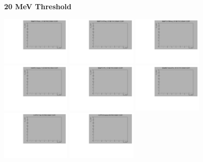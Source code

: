 \textbf{20 MeV Threshold}

\begin{center}

  \includegraphics[width=0.245\textwidth]{plots/response_matrix/Proton_KE_RHC_CC0Pi_20MeV.pdf}
  \includegraphics[width=0.245\textwidth]{plots/response_matrix/PiPlus_KE_RHC_CC0Pi_20MeV.pdf}
  \includegraphics[width=0.245\textwidth]{plots/response_matrix/PiMinus_KE_RHC_CC0Pi_20MeV.pdf}
  \includegraphics[width=0.245\textwidth]{plots/response_matrix/Charged_Pi_KE_RHC_CC0Pi_20MeV.pdf}
  \includegraphics[width=0.245\textwidth]{plots/response_matrix/Pi0_KE_RHC_CC0Pi_20MeV.pdf}
  \includegraphics[width=0.245\textwidth]{plots/response_matrix/Proton+Pion_KE_RHC_CC0Pi_20MeV.pdf}
  \includegraphics[width=0.245\textwidth]{plots/response_matrix/Total_RHC_CC0Pi_20MeV.pdf}
  \includegraphics[width=0.245\textwidth]{plots/response_matrix/Hadrons_RHC_CC0Pi_20MeV.pdf}

\end{center}

